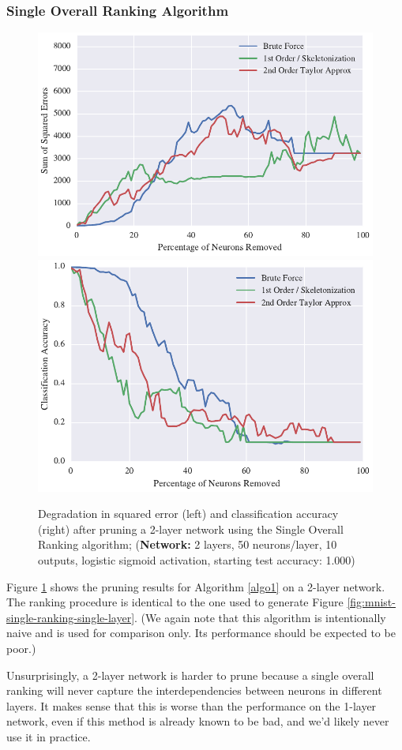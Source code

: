 \subsubsection{Single Overall Ranking Algorithm}
\begin{figure}[!ht]
\centering
\includegraphics[width=0.49\linewidth]{mnist-deep-single-pass-method.pdf}
\includegraphics[width=0.49\linewidth]{mnist-deep-single-pass-accuracy.pdf}
\caption{Degradation in squared error (left) and classification accuracy (right) after pruning a 2-layer network using the Single Overall Ranking algorithm; (\textbf{Network:} 2 layers, 50 neurons/layer, 10 outputs, logistic sigmoid activation, starting test accuracy: 1.000)}
\label{fig:mnist-single-ranking-double-layer}
\end{figure}

Figure \ref{fig:mnist-single-ranking-double-layer} shows the pruning results for Algorithm \ref{algo1} on a 2-layer network. The ranking procedure is identical to the one used to generate Figure \ref{fig:mnist-single-ranking-single-layer}. (We again note that this algorithm is intentionally naive and is used for comparison only. Its performance should be expected to be poor.) 

Unsurprisingly, a 2-layer network is harder to prune because a single overall ranking will never capture the interdependencies between neurons in different layers. It makes sense that this is worse than the performance on the 1-layer network, even if this method is already known to be bad, and we'd likely never use it in practice. 

